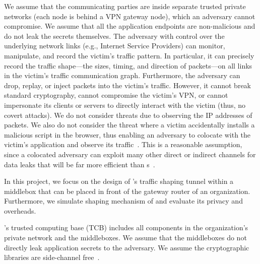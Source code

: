 We assume that the communicating parties are inside separate trusted private networks (\eg each node is behind a VPN gateway node), which an adversary cannot compromise.
We assume that all the application endpoints are non-malicious and do not leak the secrets themselves.
The adversary with control over the underlying network links (e.g., Internet Service Providers) can monitor, manipulate, and record the victim's traffic pattern.
In particular, it can precisely record the traffic shape---the sizes, timing, and direction of packets---on all links in the victim's traffic communication graph.
Furthermore, the adversary can drop, replay, or inject packets into the victim's traffic.
However, it cannot break standard cryptography, cannot compromise the victim's VPN, or cannot impersonate its clients or servers to directly interact with the victim (thus, no covert attacks).
We do not consider threats due to observing the IP addresses of packets.
We also do not consider the threat where a victim accidentally installs a malicious script in the browser, thus enabling an adversary to colocate with the
victim's application and observe its traffic~\cite{schuster2017beautyburst,mehta2022pacer}.
This is a reasonable assumption, since a colocated adversary can exploit many other direct or indirect channels for data leaks that will be far more efficient than {\nsc}s~\cite{kocher2018spectre, yarom2014flushreload, liu2015llcpractical, irazoqui2015ssa, vila2017loophole}.

In this project, we focus on the design of {\sys}'s traffic shaping tunnel
within a middlebox that can be placed in front of the gateway router of an
organization. 
Furthermore, we simulate shaping mechanism of {\sys} and evaluate its privacy and overheads.

{\sys}'s trusted computing base (TCB) includes all components in the organization's private network and the middleboxes.
We assume that the middleboxes do not directly leak application secrets to the adversary.
We assume the cryptographic libraries are side-channel free~\cite{almeida2016verifying}.

